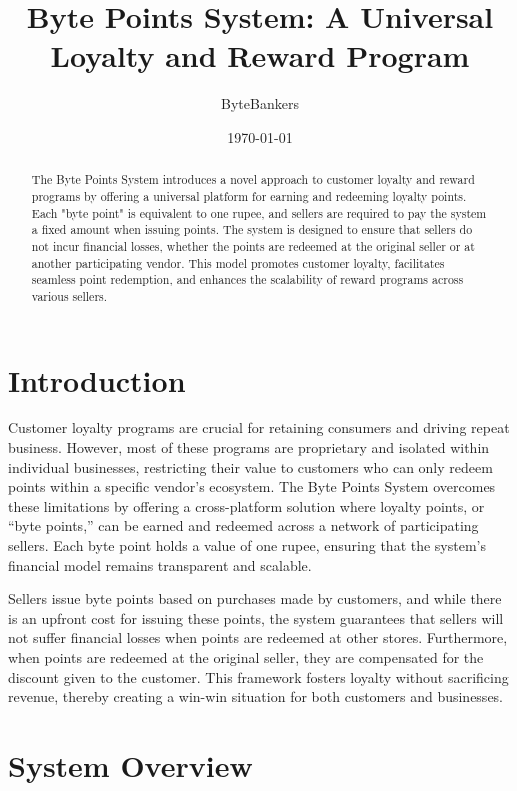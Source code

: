 \documentclass[a4paper,12pt]{article}
\title{Byte Points System: A Universal Loyalty and Reward Program}
\author{ByteBankers}
\date{\today}
\begin{document}
\maketitle

\begin{abstract}
The Byte Points System introduces a novel approach to customer loyalty and reward programs by offering a universal platform for earning and redeeming loyalty points. Each "byte point" is equivalent to one rupee, and sellers are required to pay the system a fixed amount when issuing points. The system is designed to ensure that sellers do not incur financial losses, whether the points are redeemed at the original seller or at another participating vendor. This model promotes customer loyalty, facilitates seamless point redemption, and enhances the scalability of reward programs across various sellers.
\end{abstract}

\section{Introduction}

Customer loyalty programs are crucial for retaining consumers and driving repeat business. However, most of these programs are proprietary and isolated within individual businesses, restricting their value to customers who can only redeem points within a specific vendor’s ecosystem. The Byte Points System overcomes these limitations by offering a cross-platform solution where loyalty points, or “byte points,” can be earned and redeemed across a network of participating sellers. Each byte point holds a value of one rupee, ensuring that the system’s financial model remains transparent and scalable.

Sellers issue byte points based on purchases made by customers, and while there is an upfront cost for issuing these points, the system guarantees that sellers will not suffer financial losses when points are redeemed at other stores. Furthermore, when points are redeemed at the original seller, they are compensated for the discount given to the customer. This framework fosters loyalty without sacrificing revenue, thereby creating a win-win situation for both customers and businesses.

\section{System Overview}
\end{document}
